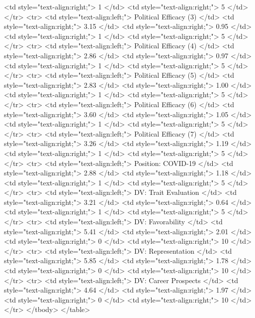    <td style="text-align:right;"> 1 </td>
   <td style="text-align:right;"> 5 </td>
  </tr>
  <tr>
   <td style="text-align:left;"> Political Efficacy (3) </td>
   <td style="text-align:right;"> 3.15 </td>
   <td style="text-align:right;"> 0.95 </td>
   <td style="text-align:right;"> 1 </td>
   <td style="text-align:right;"> 5 </td>
  </tr>
  <tr>
   <td style="text-align:left;"> Political Efficacy (4) </td>
   <td style="text-align:right;"> 2.86 </td>
   <td style="text-align:right;"> 0.97 </td>
   <td style="text-align:right;"> 1 </td>
   <td style="text-align:right;"> 5 </td>
  </tr>
  <tr>
   <td style="text-align:left;"> Political Efficacy (5) </td>
   <td style="text-align:right;"> 2.83 </td>
   <td style="text-align:right;"> 1.00 </td>
   <td style="text-align:right;"> 1 </td>
   <td style="text-align:right;"> 5 </td>
  </tr>
  <tr>
   <td style="text-align:left;"> Political Efficacy (6) </td>
   <td style="text-align:right;"> 3.60 </td>
   <td style="text-align:right;"> 1.05 </td>
   <td style="text-align:right;"> 1 </td>
   <td style="text-align:right;"> 5 </td>
  </tr>
  <tr>
   <td style="text-align:left;"> Political Efficacy (7) </td>
   <td style="text-align:right;"> 3.26 </td>
   <td style="text-align:right;"> 1.19 </td>
   <td style="text-align:right;"> 1 </td>
   <td style="text-align:right;"> 5 </td>
  </tr>
  <tr>
   <td style="text-align:left;"> Position: COVID-19 </td>
   <td style="text-align:right;"> 2.88 </td>
   <td style="text-align:right;"> 1.18 </td>
   <td style="text-align:right;"> 1 </td>
   <td style="text-align:right;"> 5 </td>
  </tr>
  <tr>
   <td style="text-align:left;"> DV: Trait Evaluation </td>
   <td style="text-align:right;"> 3.21 </td>
   <td style="text-align:right;"> 0.64 </td>
   <td style="text-align:right;"> 1 </td>
   <td style="text-align:right;"> 5 </td>
  </tr>
  <tr>
   <td style="text-align:left;"> DV: Favorability </td>
   <td style="text-align:right;"> 5.41 </td>
   <td style="text-align:right;"> 2.01 </td>
   <td style="text-align:right;"> 0 </td>
   <td style="text-align:right;"> 10 </td>
  </tr>
  <tr>
   <td style="text-align:left;"> DV: Representation </td>
   <td style="text-align:right;"> 5.85 </td>
   <td style="text-align:right;"> 1.78 </td>
   <td style="text-align:right;"> 0 </td>
   <td style="text-align:right;"> 10 </td>
  </tr>
  <tr>
   <td style="text-align:left;"> DV: Career Prospects </td>
   <td style="text-align:right;"> 4.64 </td>
   <td style="text-align:right;"> 1.97 </td>
   <td style="text-align:right;"> 0 </td>
   <td style="text-align:right;"> 10 </td>
  </tr>
</tbody>
</table>
